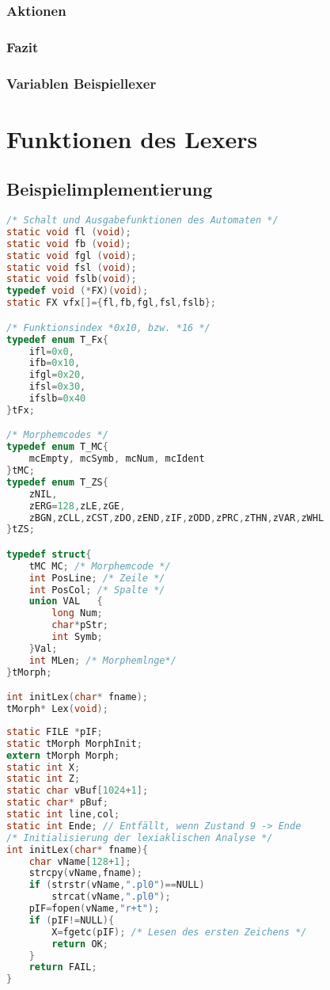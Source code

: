 \subsubsection{Aktionen}

\subsubsection{Fazit}

\subsubsection*{Variablen Beispiellexer}

\section{Funktionen des Lexers}
\subsection{Beispielimplementierung}
\begin{lstlisting}[language=C]
/* Schalt und Ausgabefunktionen des Automaten */
static void fl (void);
static void fb (void);
static void fgl (void);
static void fsl (void);
static void fslb(void);
typedef void (*FX)(void);
static FX vfx[]={fl,fb,fgl,fsl,fslb};

/* Funktionsindex *0x10, bzw. *16 */
typedef enum T_Fx{
	ifl=0x0,
	ifb=0x10,
	ifgl=0x20,
	ifsl=0x30,
	ifslb=0x40
}tFx;

/* Morphemcodes */
typedef enum T_MC{
	mcEmpty, mcSymb, mcNum, mcIdent
}tMC;
typedef enum T_ZS{
	zNIL,
	zERG=128,zLE,zGE,
	zBGN,zCLL,zCST,zDO,zEND,zIF,zODD,zPRC,zTHN,zVAR,zWHL
}tZS;

typedef struct{
	tMC MC; /* Morphemcode */
	int PosLine; /* Zeile */
	int PosCol; /* Spalte */
	union VAL	{
		long Num;
		char*pStr;
		int Symb;
	}Val;
	int MLen; /* Morphemlnge*/
}tMorph;

int initLex(char* fname);
tMorph* Lex(void);
\end{lstlisting}
\begin{lstlisting}[language=C]
static FILE *pIF;
static tMorph MorphInit;
extern tMorph Morph;
static int X;
static int Z;
static char vBuf[1024+1];
static char* pBuf;
static int line,col;
static int Ende; // Entfällt, wenn Zustand 9 -> Ende
/* Initialisierung der lexiaklischen Analyse */
int initLex(char* fname){
	char vName[128+1];
	strcpy(vName,fname);
	if (strstr(vName,".pl0")==NULL)
		strcat(vName,".pl0");
	pIF=fopen(vName,"r+t");
	if (pIF!=NULL){
		X=fgetc(pIF); /* Lesen des ersten Zeichens */
		return OK;
	}
	return FAIL;
}
\end{lstlisting}

